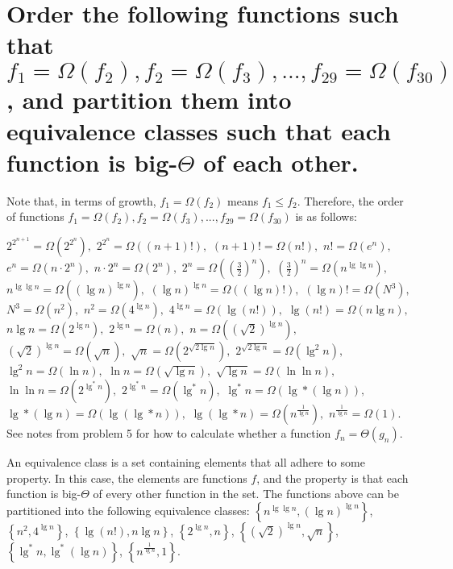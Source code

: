 \section[Problem 6]{Order the following functions such that $f_1 = \Omega(f_2), f_2 = \Omega(f_3), ..., f_{29} = \Omega(f_{30})$, and partition them into equivalence classes such that each function is big-$\Theta$ of each other.}

Note that, in terms of growth, $f_1 = \Omega(f_2)$ means $f_1 \leq f_2$. Therefore, the order of functions $f_1 = \Omega(f_2), f_2 = \Omega(f_3), ..., f_{29} = \Omega(f_{30})$ is as follows:

$2^{2^{n + 1}} = \Omega \left(2^{2^n} \right), $
$2^{2^n} = \Omega \left((n + 1)! \right), $
$(n + 1)! = \Omega \left(n! \right), $
$n! = \Omega \left(e^n \right), $
$e^n = \Omega \left(n \cdot 2^n \right), $
$n \cdot 2^n = \Omega \left(2^n \right), $
$2^n = \Omega \left(\left( \frac{3}{2} \right)^n \right), $
$\left( \frac{3}{2} \right)^n = \Omega \left(n^{\lg \lg n} \right), $
$n^{\lg \lg n} = \Omega \left(\left( \lg n \right)^{\lg n} \right), $
$\left( \lg n \right)^{\lg n} = \Omega \left((\lg n)! \right), $
$(\lg n)! = \Omega \left(N^3 \right), $
$N^3 = \Omega \left(n^2 \right), $
$n^2 = \Omega \left(4^{\lg n} \right), $
$4^{\lg n} = \Omega \left(\lg (n!) \right), $
$\lg (n!)  = \Omega \left(n \lg n \right), $
$n \lg n = \Omega \left(2^{\lg n} \right), $
$2^{\lg n} = \Omega \left(n \right), $
$n = \Omega \left(\left( \sqrt{2} \right)^{\lg n} \right), $
$\left( \sqrt{2} \right)^{\lg n} = \Omega \left(\sqrt{n} \right), $
$\sqrt{n} = \Omega \left(2^{\sqrt{2 \lg n}} \right), $
$2^{\sqrt{2 \lg n}} = \Omega \left(\lg ^2 n \right), $
$\lg ^2 n = \Omega \left(\ln n \right), $
$\ln n = \Omega \left(\sqrt{\lg n} \right), $
$\sqrt{\lg n} = \Omega \left(\ln \ln n \right), $
$\ln \ln n = \Omega \left(2^{\lg ^* n} \right), $
$2^{\lg ^* n} = \Omega \left(\lg ^* n \right), $
$\lg ^* n = \Omega \left(\lg * (\lg n) \right), $
$\lg * (\lg n) = \Omega \left(\lg (\lg * n) \right), $
$\lg (\lg * n) = \Omega \left(n^{\frac{1}{\lg n}} \right), $
$n^{\frac{1}{\lg n}} = \Omega (1)$. See notes from problem 5 for how to calculate whether a function $f_n = \Theta(g_n)$.

An equivalence class is a set containing elements that all adhere to some property. In this case, the elements are functions $f$, and the property is that each function is big-$\Theta$ of every other function in the set. The functions above can be partitioned into the following equivalence classes:
$\left\{ n^{\lg \lg n}, \left( \lg n \right)^{\lg n} \right\}$, 
$\left\{ n^2, 4^{\lg n} \right\}$,
$\left\{ \lg(n!), n \lg n \right\}$,
$\left\{ 2^{\lg n}, n \right\}$,
$\left\{ \left( \sqrt{2} \right) ^{\lg n}, \sqrt{n} \right\}$, \\ %
$\left\{ \lg^* n, \lg^* (\lg n) \right\}$,
$\left\{ n^{\frac{1}{\lg n}}, 1 \right\}$.

